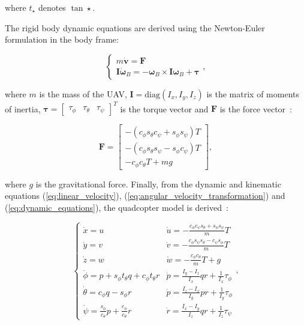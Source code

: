 where $t_{\star}$ denotes $\tan\star$.

The rigid body dynamic equations are derived using the Newton-Euler formulation in the body
frame:

\begin{equation}
  \begin{cases}
    m \dot{\mathbf{v}} = \mathbf{F} \\
    \mathbf{I} \dot{\boldsymbol{\omega}}_B = -\boldsymbol{\omega}_B \times
    \mathbf{I} \boldsymbol{\omega}_B + \boldsymbol{\tau}
  \end{cases},
  \label{eq:dynamic_equations}
\end{equation}

where $m$ is the mass of the UAV, $\mathbf{I} = \mathrm{diag}(I_x, I_y, I_z)$ is
the matrix of moments of inertia, $\boldsymbol{\tau} = \begin{bmatrix}
\tau_{\phi} & \tau_{\theta} & \tau_{\psi} \end{bmatrix}^T$ is the torque vector and
$\mathbf{F}$ is the force vector~\cite{Mellinger2011ICRA}:

\begin{equation}
  \mathbf{F} = \begin{bmatrix} -\left( c_{\phi} s_{\theta} c_{\psi} + s_{\phi}
    s_{\psi} \right) T \\ -\left( c_{\phi} s_{\theta} s_{\psi} - s_{\phi} c_{\psi}
    \right) T \\ -c_{\phi} c_{\theta} T + mg\end{bmatrix},
  \label{eq:forces}
\end{equation}

where $g$ is the gravitational force. Finally, from the dynamic and kinematic
equations (\ref{eq:linear_velocity}),
(\ref{eq:angular_velocity_transformation}) and (\ref{eq:dynamic_equations}),
the quadcopter model is derived~\cite{Sarabakha2016CDC}:

\begin{equation}
  \begin{cases}
    \dot{x} = u & \dot{u} = -\frac{c_{\phi} c_{\psi} s_{\theta} + s_{\phi} s_{\psi}}{m} T \\
    \dot{y} = v & \dot{v} = -\frac{c_{\phi} s_{\psi} s_{\theta} - c_{\psi} s_{\phi}}{m} T \\
    \dot{z} = w & \dot{w} = -\frac{c_{\phi} c_{\theta}}{m} T + g \\
    \dot{\phi} = p + s_{\phi} t_{\theta} q + c_{\phi} t_{\theta} r & \dot{p} =
    \frac{I_y - I_z}{I_x} q r + \frac{1}{I_x} \tau_{\phi} \\
    \dot{\theta} = c_{\phi} q - s_{\phi} r & \dot{p} =  \frac{I_z - I_x}{I_y} p
    r + \frac{1}{I_y} \tau_{\phi} \\
    \dot{\psi} = \frac{s_{\phi}}{c_{\theta}} p + \frac{c_{\phi}}{c_{\theta}} r
                                           & \dot{r} =  \frac{I_x - I_y}{I_z} q
                                           r + \frac{1}{I_z} \tau_{\psi}
  \end{cases},
  \label{eq:model}
\end{equation}

